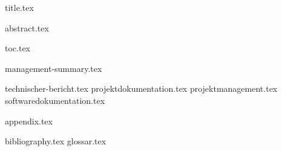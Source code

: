 \documentclass{scrbook}
\begin{document}
	\frontmatter
		{title.tex} 

		\clearpage
		{abstract.tex}

        \clearpage
        {toc.tex}

		{management-summary.tex}


	\mainmatter
		{technischer-bericht.tex}
		{projektdokumentation.tex}
		{projektmanagement.tex}
		{softwaredokumentation.tex}
	
		\cleardoublepage
		\appendix
		{appendix.tex}

		
	\backmatter
		{bibliography.tex}
		{glossar.tex}
	
\end{document}
